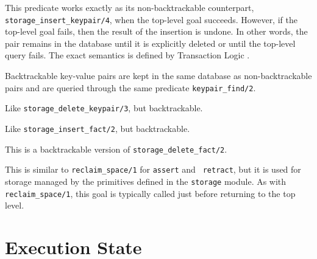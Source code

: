 \begin{description}
This predicate works exactly as its non-backtrackable counterpart,
{\tt storage\_insert\_keypair/4}, when the top-level goal succeeds.
However, if the top-level goal fails, then the result of the insertion is
undone. In other words, the pair remains in the database until it is
explicitly deleted or until the top-level query fails. The exact semantics
is defined by Transaction Logic \cite{BoKi94}.

Backtrackable key-value pairs are kept in the same database as
non-backtrackable pairs and are queried through the same predicate
{\tt keypair\_find/2}.

Like {\tt storage\_delete\_keypair/3}, but backtrackable.


 
Like {\tt storage\_insert\_fact/2}, but backtrackable.

 
This is a backtrackable version of {\tt storage\_delete\_fact/2}.

 
This is similar to {\tt reclaim\_space/1} for {\tt assert} and {\tt
  retract}, but it is used for storage managed by the primitives defined in
the {\tt storage} module. As with {\tt reclaim\_space/1}, this goal is
typically called just before returning to the top level.
\end{description}



\section{Execution State}\label{environmental}

